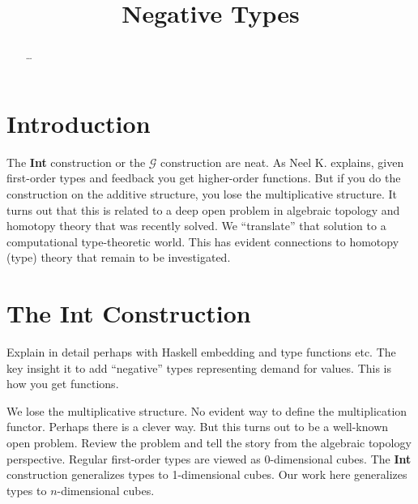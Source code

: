 \documentclass[authoryear,preprint]{sigplanconf}
\begin{document}
\lstset{breaklines=true, breakatwhitespace=true}
\lstset{numbers=none, numbersep=5pt, stepnumber=2, numberstyle=\scriptsize}
\lstset{rangeprefix=/*!\ , rangesuffix=\ !*\/, includerangemarker=false}

\title{Negative Types}
\authorinfo{}{}{}
\maketitle

\begin{abstract}
\ldots
\end{abstract}

\section{Introduction}

The \textbf{Int} construction or the $\mathcal{G}$ construction are neat. As
Neel K. explains, given first-order types and feedback you get higher-order
functions. But if you do the construction on the additive structure, you lose
the multiplicative structure. It turns out that this is related to a deep
open problem in algebraic topology and homotopy theory that was recently
solved. We ``translate'' that solution to a computational type-theoretic
world. This has evident connections to homotopy (type) theory that remain to
be investigated.

\section{The \textbf{Int} Construction} 

Explain in detail perhaps with Haskell embedding and type functions etc. The
key insight it to add ``negative'' types representing demand for values. This
is how you get functions.

We lose the multiplicative structure. No evident way to define the
multiplication functor. Perhaps there is a clever way. But this turns out to
be a well-known open problem. Review the problem and tell the story from the
algebraic topology perspective. Regular first-order types are viewed as
$0$-dimensional cubes. The \textbf{Int} construction generalizes types to
1-dimensional cubes. Our work here generalizes types to $n$-dimensional
cubes.
\end{document}
